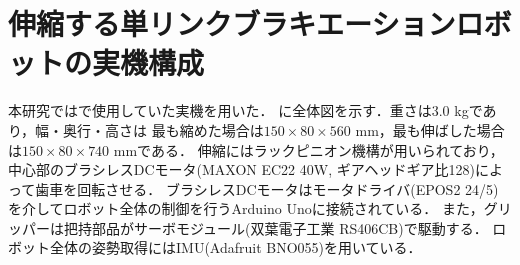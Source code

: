         
        \section{伸縮する単リンクブラキエーションロボットの実機構成}
          
          本研究では\cite{Hijiri:Robomech2024}で使用していた実機を用いた．
          に全体図を示す．重さは3.0 kgであり，幅・奥行・高さは
          最も縮めた場合は$150{\times}80{\times}560$ mm，最も伸ばした場合は$150{\times}80{\times}740$ mmである．
          伸縮にはラックピニオン機構が用いられており，中心部のブラシレスDCモータ(MAXON EC22 40W, ギアヘッドギア比128)によって歯車を回転させる．
          ブラシレスDCモータはモータドライバ(EPOS2 24/5)を介してロボット全体の制御を行うArduino Unoに接続されている．
          また，グリッパーは把持部品がサーボモジュール(双葉電子工業 RS406CB)で駆動する．
          ロボット全体の姿勢取得にはIMU(Adafruit BNO055)を用いている．
          

            
          

